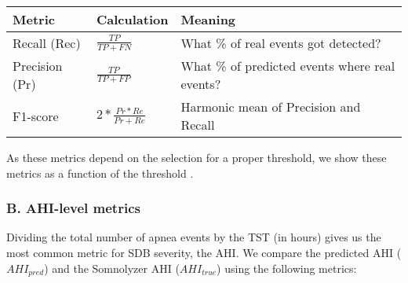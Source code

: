 \renewcommand{\arraystretch}{1.5}
\begin{table}[h!]
    \centering
    \begin{tabular}{p{1.6cm} p{2cm} p{4.4cm}}
        Metric & Calculation & Meaning \\
        \hline
        Recall \newline (Rec) & $\frac{TP}{TP+FN}$ & What \% of real events \newline got detected? \\
        Precision \newline (Pr) & $\frac{TP}{TP+FP}$ & What \% of predicted events \newline where real events? \\
        F1-score & $2 * \frac{Pr * Re}{Pr + Re}$ & Harmonic mean of \newline Precision and Recall \\
    \end{tabular}
\end{table}

As these metrics depend on the selection for a proper threshold, we  show these metrics as a function of the threshold .

\subsubsection*{B. AHI-level metrics}

Dividing the total number of apnea events by the TST (in hours) gives us the most common metric for SDB severity, the AHI. We compare the predicted AHI ($AHI_{pred}$) and the Somnolyzer AHI ($AHI_{true}$) using the following metrics:

